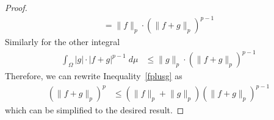 \documentclass[12pt]{article}
\theoremstyle{plain}
\theoremstyle{definition}
\theoremstyle{remark}
\begin{document}
\begin{proof}
\begin{align*}
  =
  \lVert f\rVert_p \cdot
  \left(\lVert f+g\rVert_p\right)^{p-1}
\end{align*}
Similarly for the other integral
\begin{align*}
  \int_\Omega |g|\cdot |f+g|^{p-1}\; d\mu
  &\leq
  \lVert g\rVert_p \cdot
  \left(\lVert f+g\rVert_p\right)^{p-1}
\end{align*}
Therefore, we can rewrite Inequality~\ref{fplusg} as
\begin{align*}
  \left(\lVert f+g\rVert_p\right)^p
  &\leq
  \left(\lVert f\rVert_p + \lVert g\rVert_p \right)
  \left(\lVert f+g\rVert_p\right)^{p-1}
\end{align*}
which can be simplified to the desired result.
\end{proof}
\end{document}
